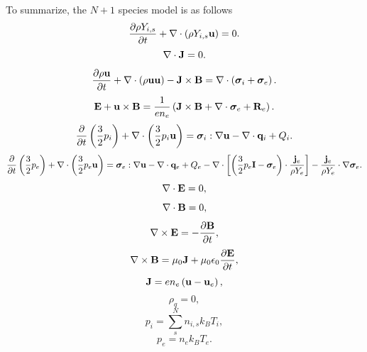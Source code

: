 \documentclass[a4paper,11pt]{report}
\begin{document}
To summarize, the $N+1$ species model is as follows
\begin{equation}
    \label{eq:sf_1ionvel_ni}
    \frac{\partial \rho Y_{i,s}}{\partial t} + \nabla \cdot \left( \rho Y_{i,s} \mathbf{u} \right) = 0.
\end{equation}
\begin{equation}
    \label{eq:sf_1ionvel_ne}
    \nabla \cdot \mathbf{J} = 0.
\end{equation}
\begin{equation}
    \label{eq:sf_1ionvel_ui}
    \frac{\partial \rho \mathbf{u}}{\partial t} + \nabla \cdot \left( \rho \mathbf{u} \mathbf{u} \right) - \mathbf{J} \times \mathbf{B} = \nabla \cdot \left( \bm \sigma_i + \bm \sigma_e \right).
\end{equation}
\begin{equation}
    \label{eq:sf_1ionvel_ue}
    \mathbf{E} + \mathbf{u} \times \mathbf{B} = \frac{1}{e n_e} \left( \mathbf{J} \times \mathbf{B} + \nabla \cdot \bm \sigma_e + \mathbf{R}_e \right) .
\end{equation}
\begin{equation}
    \label{eq:sf_1ionvel_iei}
    \frac{\partial}{\partial t} \left( \frac{3}{2} p_i \right) + \nabla \cdot \left( \frac{3}{2} p_i \mathbf{u} \right) = \bm \sigma_i : \nabla \mathbf{u} - \nabla \cdot \mathbf{q}_i + Q_i.
\end{equation}
\begin{equation}
    \label{eq:sf_1ionvel_iee}
    \frac{\partial}{\partial t} \left( \frac{3}{2} p_e \right) + \nabla \cdot \left( \frac{3}{2} p_e \mathbf{u} \right) = \bm \sigma_e : \nabla \mathbf{u} - \nabla \cdot \mathbf{q}_e + Q_e - \nabla \cdot \left[ \left( \frac{3}{2} p_e \mathbf{I} - \bm \sigma_e \right) \cdot \frac{\mathbf{j}_e}{\rho Y_e}  \right] - \frac{\mathbf{j}_e}{\rho Y_e} \cdot \nabla \bm \sigma_e.
\end{equation}
\begin{equation}
    \label{eq:sf_1ionvel_maxwell_3}
    \nabla \cdot \mathbf{E} = 0,
\end{equation}
\begin{equation}
    \label{eq:sf_1ionvel_maxwell_4}
    \nabla \cdot \mathbf{B} = 0,
\end{equation}
\begin{equation}
    \label{eq:sf_1ionvel_maxwell_1}
    \nabla \times \mathbf{E} = -\frac{ \partial \mathbf{B}}{\partial t},
\end{equation}
\begin{equation}
    \label{eq:sf_1ionvel_maxwell_2}
    \nabla \times \mathbf{B} = \mu_0 \mathbf{J} + \mu_0 \epsilon_0 \frac{\partial \mathbf{E}}{\partial t},
\end{equation}
\begin{equation}
    \label{eq:sf_1ionvel_curr_density}
    \mathbf{J} = e n_e \left( \mathbf{u} - \mathbf{u}_e \right),
\end{equation}
\begin{equation}
    \label{eq:sf_1ionvel_mass_density}
    \rho_q = 0,
\end{equation}
\begin{equation}
    \label{eq:sf_1ionvel_eos_ion}
    p_i = \sum_s^N n_{i,s} k_B T_i,
\end{equation}
\begin{equation}
    \label{eq:sf_1ionvel_eos_elec}
    p_e = n_e k_B T_e.
\end{equation}
\end{document}
